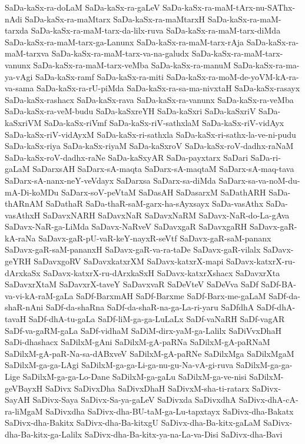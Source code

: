 {SaDa-kaSx-ra-doLaM
SaDa-kaSx-ra-gaLeV
SaDa-kaSx-ra-maM-tArx-nu-SAThx-nAdi
SaDa-kaSx-ra-maMtarx
SaDa-kaSx-ra-maMtarxH
SaDa-kaSx-ra-maM-tarxda
SaDa-kaSx-ra-maM-tarx-da-lilx-ruva
SaDa-kaSx-ra-maM-tarx-diMda
SaDa-kaSx-ra-maM-tarx-ga-Lanunx
SaDa-kaSx-ra-maM-tarx-rAja
SaDa-kaSx-ra-maM-tarxva
SaDa-kaSx-ra-maM-tarx-va-na-galudx
SaDa-kaSx-ra-maM-tarx-vanunx
SaDa-kaSx-ra-maM-tarx-veMba
SaDa-kaSx-ra-manuM
SaDa-kaSx-ra-ma-ya-vAgi
SaDa-kaSx-ramf
SaDa-kaSx-ra-miti
SaDa-kaSx-ra-moM-de-yoVM-kA-ra-va-sama
SaDa-kaSx-ra-rU-piMda
SaDa-kaSx-ra-sa-ma-nivxtaH
SaDa-kaSx-rasayx
SaDa-kaSx-rashacx
SaDa-kaSx-rava
SaDa-kaSx-ra-vanunx
SaDa-kaSx-ra-veMba
SaDa-kaSx-ra-veM-budu
SaDa-kaSxreYH
SaDa-kaSxri
SaDa-kaSxriV
SaDa-kaSxriVM
SaDa-kaSx-riVmf
SaDa-kaSx-riV-sathxlaM
SaDa-kaSx-riV-vidAyx
SaDa-kaSx-riV-vidAyxM
SaDa-kaSx-ri-sathxla
SaDa-kaSx-ri-sathx-la-ve-ni-pudu
SaDa-kaSx-riya
SaDa-kaSx-riyaM
SaDa-kaSxroV
SaDa-kaSx-roV-dadhx-raNaM
SaDa-kaSx-roV-dadhx-raNe
SaDa-kaSxyAR
SaDa-payxtarx
SaDari
SaDa-ri-gaLaM
SaDarxsAH
SaDarx-sA-maqta
SaDarx-sA-maqtaM
SaDarx-sA-maq-tava
SaDarx-sA-nanx-neY-veVdayx
SaDarxsa
SaDarx-sa-diMda
SaDarx-sa-va-noM-du-mA-Di-koMDu
SaDarx-soV-peVtaM
SaDasAH
SaDasarxM
SaDathARH
SaDa-thARnAM
SaDathaR
SaDa-thaR-saM-garx-ha-sAyxsayx
SaDa-vasAthx
SaDa-vasAthxH
SaDavxNARH
SaDavxNaR
SaDavxNaRM
SaDavx-NaR-do-La-gAva
SaDavx-NaR-ga-LiMda
SaDavx-NaRveV
SaDavxgaR
SaDavxgaRH
SaDavx-gaR-kA-raNa
SaDavx-gaR-pU-vaR-keY-nayxR-seVtf
SaDavx-gaR-saM-pananx
SaDavx-gaR-saM-pananxH
SaDavx-gaR-va-ra-taDe
SaDavx-gaR-vilalx
SaDavx-geYRH
SaDavxgoRV
SaDavxkatxrXM
SaDavx-katxrX-mapi
SaDavx-katxrX-ru-dArxkaSx
SaDavx-katxrX-ru-dArxkaSxH
SaDavx-katxrXshacx
SaDavxrXta
SaDavxrXtaM
SaDavxrX-taveY
SaDavxvaR
SaDeVteV
SaDeVva
SaDf
SaDf-BA-va-vi-kA-raM-gaLa
SaDf-BarxmAH
SaDf-Barxme
SaDf-Barx-me-gaLaM
SaDf-da-shaR-nAni
SaDf-da-shaRna
SaDf-da-shaR-na-ga-La-ri-yaru
SaDfdhA
SaDf-dhA-tavaH
SaDf-dhA-tu-gaLa
SaDf-liM-ga-ga-LuLaLx
SaDf-vaNaRH
SaDf-vagAR
SaDf-va-gaRM-gaLa
SaDf-vidhaM
SaDiM-dirx-yaM-ga-Lalilx
SaDiVvxDhaH
SaDi-dhashacx
SaDilxM-gAni
SaDilxM-gA-paRNa
SaDilxM-gA-paRNaM
SaDilxM-gA-paR-Na-sa-dABxveV
SaDilxM-gA-paRNe
SaDilxMga
SaDilxMgaM
SaDilxM-ga-ga-LAgi
SaDilxM-ga-ga-Li-ga-nu-gu-Na-vA-gi-ruva
SaDilxM-ga-ga-Lige
SaDilxM-ga-ga-Lo-Dane
SaDilxM-ga-gaLu
SaDilxM-ga-ve-nisi
SaDilxM-geVBayxH
SaDivx
SaDivxDha
SaDivxDhaH
SaDivxM-sha-ti-ratarx
SaDivx-SayAH
SaDivx-Saya
SaDivx-Sa-ya-gaLeV
SaDivxda
SaDivxdhA
SaDivx-dhA-cA-ra-liMgaM
SaDivxdha
SaDivx-dha-BU-taM-ga-Lu-tapxtayx
SaDivx-dha-Bakatx
SaDivx-dha-Bakitx
SaDivx-dha-Ba-kitxgU
SaDivx-dha-Ba-kitx-gaLaM
SaDivx-dha-Ba-kitx-ga-Lalilx
SaDivx-dha-Ba-kitx-ya-na-La-va-Disi
SaDivx-dha-Bavi
}
